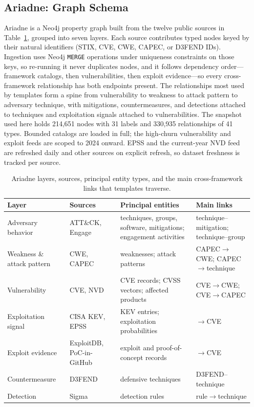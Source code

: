 \documentclass[conference]{IEEEtran}
\begin{document}
\subsection{Ariadne: Graph Schema}
Ariadne is a Neo4j property graph built from the twelve public sources in Table~\ref{tab:schema}, grouped into seven layers. Each source contributes typed nodes keyed by their natural identifiers (STIX, CVE, CWE, CAPEC, or D3FEND IDs). Ingestion uses Neo4j \texttt{MERGE} operations under uniqueness constraints on those keys, so re-running it never duplicates nodes, and it follows dependency order---framework catalogs, then vulnerabilities, then exploit evidence---so every cross-framework relationship has both endpoints present. The relationships most used by templates form a spine from vulnerability to weakness to attack pattern to adversary technique, with mitigations, countermeasures, and detections attached to techniques and exploitation signals attached to vulnerabilities. The snapshot used here holds 214,651 nodes with 31 labels and 330,935 relationships of 41 types. Bounded catalogs are loaded in full; the high-churn vulnerability and exploit feeds are scoped to 2024 onward. EPSS and the current-year NVD feed are refreshed daily and other sources on explicit refresh, so dataset freshness is tracked per source.

\begin{table}[t]
\caption{Ariadne layers, sources, principal entity types, and the main cross-framework links that templates traverse.}
\label{tab:schema}
\centering
\scriptsize
\setlength{\tabcolsep}{2.5pt}
\begin{tabular}{@{}p{}p{}p{}p{}@{}}
\toprule
Layer & Sources & Principal entities & Main links \\
\midrule
Adversary behavior & ATT\&CK, Engage & techniques, groups, software, mitigations; engagement activities & technique--mitigation; technique--group \\
Weakness \& attack pattern & CWE, CAPEC & weaknesses; attack patterns & CAPEC$\rightarrow$CWE; CAPEC$\rightarrow$technique \\
Vulnerability & CVE, NVD & CVE records; CVSS vectors; affected products & CVE$\rightarrow$CWE; CVE$\rightarrow$CAPEC \\
Exploitation signal & CISA KEV, EPSS & KEV entries; exploitation probabilities & $\rightarrow$CVE \\
Exploit evidence & ExploitDB, PoC-in-GitHub & exploit and proof-of-concept records & $\rightarrow$CVE \\
Counter\-measure & D3FEND & defensive techniques & D3FEND--technique \\
Detection & Sigma & detection rules & rule$\rightarrow$technique \\
\bottomrule
\end{tabular}
\end{table}
\end{document}
